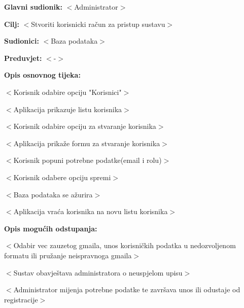					\noindent {}
					\begin{packed_item}

						\item \textbf{Glavni sudionik: }$<$Administrator$>$
						\item  \textbf{Cilj:} $<$Stvoriti korisnicki račun za pristup sustavu$>$
						\item  \textbf{Sudionici:} $<$Baza podataka$>$
						\item  \textbf{Preduvjet:} $<$-$>$
						\item  \textbf{Opis osnovnog tijeka:}

						\item[] \begin{packed_enum}

							\item $<$Korisnik odabire opciju "Korisnici"$>$
							\item $<$Aplikacija prikazuje listu korisnika$>$
							\item $<$Korisnik odabire opciju za stvaranje korisnika$>$
							\item $<$Aplikacija prikaže formu za stvaranje korisnika$>$
							\item $<$Korisnik popuni potrebne podatke(email i rolu)$>$
							\item $<$Korisnik odabere opciju spremi$>$
							\item $<$Baza podataka se ažurira$>$
							\item $<$Aplikacija vraća korisnika na novu listu korisnika$>$
						\end{packed_enum}

						\item  \textbf{Opis mogućih odstupanja:}

						\item[] \begin{packed_item}

							\item[2.a] $<$Odabir vec zauzetog gmaila, unos korisničkih
							podatka u nedozvoljenom formatu ili pružanje neispravnoga gmaila$>$
							\item[] \begin{packed_enum}

								\item $<$Sustav obavještava administratora o neuspjelom upisu$>$
								\item $<$Administrator mijenja potrebne podatke te završava unos ili
								odustaje od registracije$>$

							\end{packed_enum}

						\end{packed_item}
					\end{packed_item}

